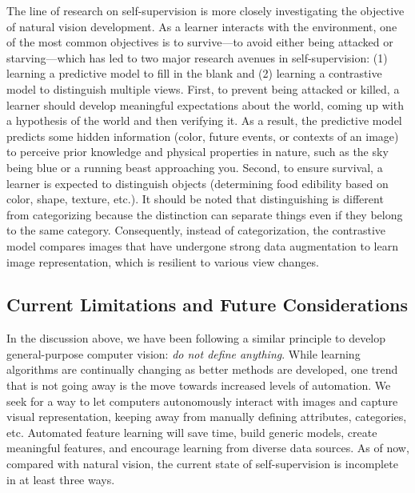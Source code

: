 The line of research on self-supervision is more closely investigating the objective of natural vision development. As a learner interacts with the environment, one of the most common objectives is to survive---to avoid either being attacked or starving---which has led to two major research avenues in self-supervision: (1) learning a predictive model to fill in the blank and (2) learning a contrastive model to distinguish multiple views. First, to prevent being attacked or killed, a learner should develop meaningful expectations about the world, coming up with a hypothesis of the world and then verifying it. As a result, the predictive model predicts some hidden information (\eg color, future events, or contexts of an image) to perceive prior knowledge and physical properties in nature, such as the sky being blue or a running beast approaching you. Second, to ensure survival, a learner is expected to distinguish objects (\eg determining food edibility based on color, shape, texture, etc.). It should be noted that distinguishing is different from categorizing because the distinction can separate things even if they belong to the same category. Consequently, instead of categorization, the contrastive model compares images that have undergone strong data augmentation to learn image representation, which is resilient to various view changes.

\subsection{Current Limitations and Future Considerations}

In the discussion above, we have been following a similar principle to develop general-purpose computer vision: \textit{do not define anything}. While learning algorithms are continually changing as better methods are developed, one trend that is not going away is the move towards increased levels of automation. We seek for a way to let computers autonomously interact with images and capture visual representation, keeping away from manually defining attributes, categories, etc. Automated feature learning will save time, build generic models, create meaningful features, and encourage learning from diverse data sources. As of now, compared with natural vision, the current state of self-supervision is incomplete in at least three ways.

